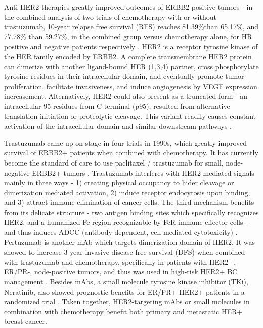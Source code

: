 Anti-HER2 therapies greatly improved outcomes of ERBB2 positive tumors - in the combined analysis of two trials of chemotherapy with or without trastuzumab, 10-year relapse free survival (RFS) reaches 81.39\%than 65.17\%, and 77.78\% than 59.27\%, in the combined group versus chemotherapy alone, for HR positive and negative patients respectively \citep{chumsri2019incidence}. HER2 is a receptor tyrosine kinase of the HER family encoded by ERBB2. A complete transmembrane HER2 protein can dimerize with another ligand-bound HER (1,3,4) partner, cross phosphorylate tyrosine residues in their intracellular domain, and eventually promote tumor proliferation, facilitate invasiveness, and induce angiogenesis by VEGF expression increasement. Alternatively, HER2 could also present as a truncated form - an intracellular 95 residues from C-terminal (p95), resulted from alternative translation initiation or proteolytic cleavage. This variant readily causes constant activation of the intracellular domain and similar downstream pathways \citep{hudis2007trastuzumab}. 

Trastuzumab came up on stage in four trials in 1990s, which greatly improved survival of ERBB2+ patients when combined with chemotherapy. It has currently become the standard of care to use paclitaxel / trastuzumab for small, node-negative ERBB2+ tumors \citep{tolaney2015adjuvant}. Trastuzumab interferes with HER2 mediated signals mainly in three ways - 1) creating physical occupancy to hider cleavage or dimerization mediated activation, 2) induce receptor endocytosis upon binding, and 3) attract immune elimination of cancer cells. The third mechanism benefits from its delicate structure - two antigen binding sites which specifically recognizes HER2, and a humanized Fc region recognizable by FcR immune effector cells - and thus induces ADCC (antibody-dependent, cell-mediated cytotoxicity) \citep{hudis2007trastuzumab}. Pertuzumab is another mAb which targets dimerization domain of HER2. It was showed to increase 3-year invasive disease free survival (DFS) when combined with trastuzumab and chemotherapy, specifically in patients with HER2+, ER/PR-, node-positive tumors, and thus was used in high-risk HER2+ BC management \citep{von2017adjuvant}. Besides mAbs, a small molecule tyrosine kinase inhibitor (TKi), Neratinib, also showed prognostic benefits for ER/PR+ HER2+ patients in a randomized trial \citep{martin2017neratinib}. Taken together, HER2-targeting mAbs or small molecules in combination with chemotherapy benefit both primary and metastatic HER+ breast cancer. 

